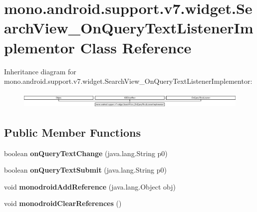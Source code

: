 \hypertarget{classmono_1_1android_1_1support_1_1v7_1_1widget_1_1_search_view___on_query_text_listener_implementor}{}\section{mono.\+android.\+support.\+v7.\+widget.\+Search\+View\+\_\+\+On\+Query\+Text\+Listener\+Implementor Class Reference}
\label{classmono_1_1android_1_1support_1_1v7_1_1widget_1_1_search_view___on_query_text_listener_implementor}
Inheritance diagram for mono.\+android.\+support.\+v7.\+widget.\+Search\+View\+\_\+\+On\+Query\+Text\+Listener\+Implementor\+:\begin{figure}[H]
\begin{center}
\leavevmode
\includegraphics[height=0.796020cm]{classmono_1_1android_1_1support_1_1v7_1_1widget_1_1_search_view___on_query_text_listener_implementor}
\end{center}
\end{figure}
\subsection*{Public Member Functions}
\begin{DoxyCompactItemize}
\item 
\mbox{\label{classmono_1_1android_1_1support_1_1v7_1_1widget_1_1_search_view___on_query_text_listener_implementor_a37164a1e4575c60d88089e3d3ae36c55}} 
boolean {\bfseries on\+Query\+Text\+Change} (java.\+lang.\+String p0)
\item 
\mbox{\label{classmono_1_1android_1_1support_1_1v7_1_1widget_1_1_search_view___on_query_text_listener_implementor_ab4143af34811f748cd0c6cfcda75237a}} 
boolean {\bfseries on\+Query\+Text\+Submit} (java.\+lang.\+String p0)
\item 
\mbox{\label{classmono_1_1android_1_1support_1_1v7_1_1widget_1_1_search_view___on_query_text_listener_implementor_aa5801bb2e02637a33a8f7dd14016f759}} 
void {\bfseries monodroid\+Add\+Reference} (java.\+lang.\+Object obj)
\item 
\mbox{\label{classmono_1_1android_1_1support_1_1v7_1_1widget_1_1_search_view___on_query_text_listener_implementor_ac9620633edcb7b40810131b0604bb68d}} 
void {\bfseries monodroid\+Clear\+References} ()
\end{DoxyCompactItemize}
